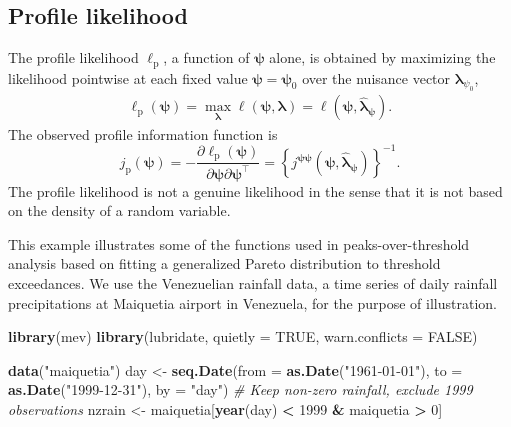 \documentclass[]{book}
\newenvironment{Shaded}{\begin{snugshade}}{\end{snugshade}}
\newcommand{\CommentTok}[1]{\textcolor[rgb]{0.56,0.35,0.01}{\textit{#1}}}
\newcommand{\DataTypeTok}[1]{\textcolor[rgb]{0.13,0.29,0.53}{#1}}
\newcommand{\DecValTok}[1]{\textcolor[rgb]{0.00,0.00,0.81}{#1}}
\newcommand{\KeywordTok}[1]{\textcolor[rgb]{0.13,0.29,0.53}{\textbf{#1}}}
\newcommand{\NormalTok}[1]{#1}
\newcommand{\OperatorTok}[1]{\textcolor[rgb]{0.81,0.36,0.00}{\textbf{#1}}}
\newcommand{\OtherTok}[1]{\textcolor[rgb]{0.56,0.35,0.01}{#1}}
\newcommand{\StringTok}[1]{\textcolor[rgb]{0.31,0.60,0.02}{#1}}
\begin{document}
\hypertarget{profile-likelihood}{%
\subsection{Profile likelihood}\label{profile-likelihood}}

The profile
likelihood \(\ell_\mathrm{p}\), a function of \(\boldsymbol{\psi}\) alone, is obtained by maximizing the
likelihood pointwise at each fixed value \(\boldsymbol{\psi}=\boldsymbol{\psi}_0\) over the nuisance vector
\(\boldsymbol{\lambda}_{\psi_0}\),
\begin{align*}
   \ell_\mathrm{p}(\boldsymbol{\psi})=\max_{\boldsymbol{\lambda}}\ell(\boldsymbol{\psi}, \boldsymbol{\lambda})=\ell(\boldsymbol{\psi}, \hat{\boldsymbol{\lambda}}_{\boldsymbol{\psi}}).
\end{align*}
The observed profile information function is 
\[j_\mathrm{p}(\boldsymbol{\psi})
=-\frac{\partial \ell_\mathrm{p}(\boldsymbol{\psi})}{\partial \boldsymbol{\psi}\partial \boldsymbol{\psi}^\top} 
= \left\{j^{\boldsymbol{\psi\psi}}(\boldsymbol{\psi}, \hat{\boldsymbol{\lambda}}_{\boldsymbol{\psi}})\right\}^{-1}.
\]
The profile likelihood is not a
genuine likelihood in the sense that it is not based on the density of a random variable.

This example illustrates some of the functions used in peaks-over-threshold analysis based on fitting a generalized Pareto distribution to threshold exceedances. We use the Venezuelian rainfall data, a time series of daily rainfall precipitations at Maiquetia airport in Venezuela, for the purpose of illustration.

\begin{Shaded}
\begin{Highlighting}[]
\KeywordTok{library}\NormalTok{(mev)}
\KeywordTok{library}\NormalTok{(lubridate, }\DataTypeTok{quietly =} \OtherTok{TRUE}\NormalTok{, }\DataTypeTok{warn.conflicts =} \OtherTok{FALSE}\NormalTok{)}

\KeywordTok{data}\NormalTok{(}\StringTok{"maiquetia"}\NormalTok{)}
\NormalTok{day <-}\StringTok{ }\KeywordTok{seq.Date}\NormalTok{(}\DataTypeTok{from =} \KeywordTok{as.Date}\NormalTok{(}\StringTok{"1961-01-01"}\NormalTok{), }
                \DataTypeTok{to =} \KeywordTok{as.Date}\NormalTok{(}\StringTok{"1999-12-31"}\NormalTok{), }\DataTypeTok{by =} \StringTok{"day"}\NormalTok{)}
\CommentTok{# Keep non-zero rainfall, exclude 1999 observations}
\NormalTok{nzrain <-}\StringTok{ }\NormalTok{maiquetia[}\KeywordTok{year}\NormalTok{(day) }\OperatorTok{<}\StringTok{ }\DecValTok{1999} \OperatorTok{&}\StringTok{ }\NormalTok{maiquetia }\OperatorTok{>}\StringTok{ }\DecValTok{0}\NormalTok{]}
\end{Highlighting}
\end{Shaded}
\end{document}
